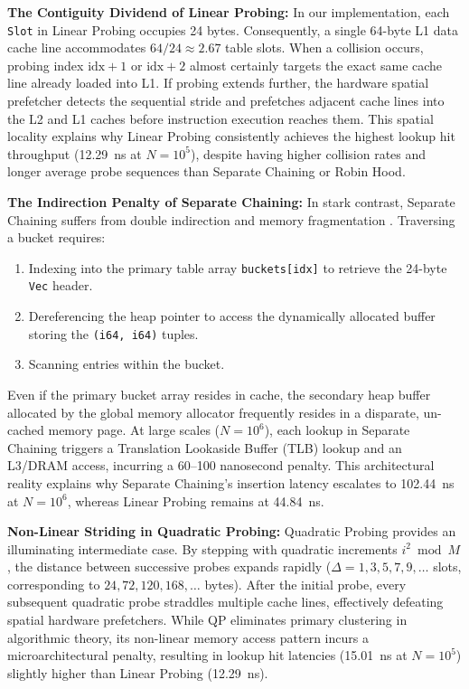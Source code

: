 \documentclass[conference]{IEEEtran}
\begin{document}
\textbf{The Contiguity Dividend of Linear Probing:} In our implementation, each \texttt{Slot} in Linear Probing occupies 24 bytes. Consequently, a single 64-byte L1 data cache line accommodates $64 / 24 \approx 2.67$ table slots. When a collision occurs, probing index $\text{idx} + 1$ or $\text{idx} + 2$ almost certainly targets the exact same cache line already loaded into L1. If probing extends further, the hardware spatial prefetcher detects the sequential stride and prefetches adjacent cache lines into the L2 and L1 caches before instruction execution reaches them. This spatial locality explains why Linear Probing consistently achieves the highest lookup hit throughput (12.29~ns at $N = 10^5$), despite having higher collision rates and longer average probe sequences than Separate Chaining or Robin Hood.

\textbf{The Indirection Penalty of Separate Chaining:} In stark contrast, Separate Chaining suffers from double indirection and memory fragmentation \cite{vitter2001}. Traversing a bucket requires:
\begin{enumerate}
  \item Indexing into the primary table array \texttt{buckets[idx]} to retrieve the 24-byte \texttt{Vec} header.
  \item Dereferencing the heap pointer to access the dynamically allocated buffer storing the \texttt{(i64, i64)} tuples.
  \item Scanning entries within the bucket.
\end{enumerate}
Even if the primary bucket array resides in cache, the secondary heap buffer allocated by the global memory allocator frequently resides in a disparate, un-cached memory page. At large scales ($N = 10^6$), each lookup in Separate Chaining triggers a Translation Lookaside Buffer (TLB) lookup and an L3/DRAM access, incurring a 60--100 nanosecond penalty. This architectural reality explains why Separate Chaining's insertion latency escalates to 102.44~ns at $N = 10^6$, whereas Linear Probing remains at 44.84~ns.

\textbf{Non-Linear Striding in Quadratic Probing:} Quadratic Probing provides an illuminating intermediate case. By stepping with quadratic increments $i^2 \bmod M$, the distance between successive probes expands rapidly ($\Delta = 1, 3, 5, 7, 9, \dots$ slots, corresponding to $24, 72, 120, 168, \dots$ bytes). After the initial probe, every subsequent quadratic probe straddles multiple cache lines, effectively defeating spatial hardware prefetchers. While QP eliminates primary clustering in algorithmic theory, its non-linear memory access pattern incurs a microarchitectural penalty, resulting in lookup hit latencies (15.01~ns at $N = 10^5$) slightly higher than Linear Probing (12.29~ns).
\end{document}
